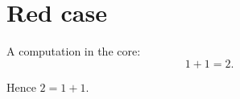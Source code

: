 \chapter{Red case}\label{c99}

A computation in the core:
\begin{equation}\label{c99.eq.eins}
  1 + 1 = 2.
\end{equation}
\begin{corollary}
  Hence $2 = 1 + 1$.
\end{corollary}
